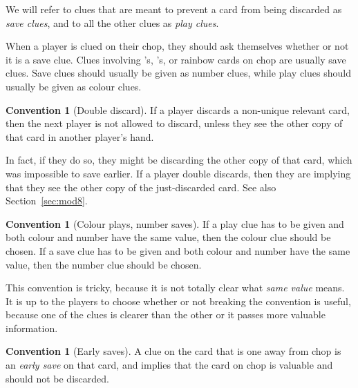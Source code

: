 \documentclass[a4paper]{article}
\theoremstyle{plain}
\theoremstyle{definition}
\newtheorem{convention}[theorem]{Convention}
\begin{document}
We will refer to clues that are meant to prevent a card from being discarded as \textit{save clues}, and to all the other clues as \textit{play clues}.

When a player is clued on their chop, they should ask themselves whether or not it is a save clue. Clues involving 's, 's, or rainbow cards on chop are usually save clues. Save clues should usually be given as number clues, while play clues should usually be given as colour clues. %

\begin{convention}[Double discard]
	\label{double-discard}
	If a player discards a non-unique relevant card, then the next player is not allowed to discard, unless they see the other copy of that card in another player's hand.
\end{convention}

In fact, if they do so, they might be discarding the other copy of that card, which was impossible to save earlier. If a player double discards, then they are implying that they see the other copy of the just-discarded card. See also Section~\ref{sec:mod8}.

\begin{convention}[Colour plays, number saves]
	If a play clue has to be given and both colour and number have the same value, then the colour clue should be chosen. If a save clue has to be given and both colour and number have the same value, then the number clue should be chosen.
\end{convention}

This convention is tricky, because it is not totally clear what \textit{same value} means. It is up to the players to choose whether or not breaking the convention is useful, because one of the clues is clearer than the other or it passes more valuable information.

\begin{convention}[Early saves]
	A  clue on the card that is one away from chop is an \textit{early save} on that card, and implies that the card on chop is valuable and should not be discarded.
\end{convention}
\end{document}
